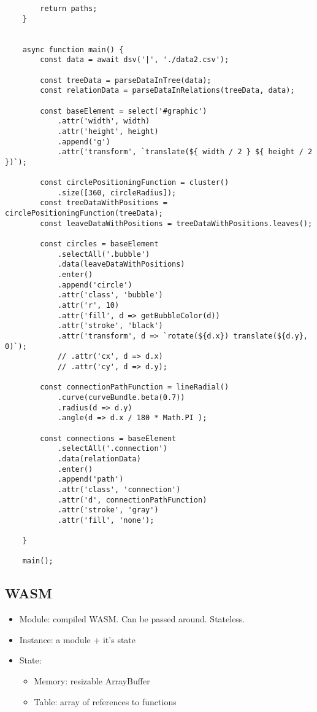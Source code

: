 {\begin{lstlisting}
        return paths;
    }
    
    
    async function main() {
        const data = await dsv('|', './data2.csv');
    
        const treeData = parseDataInTree(data);
        const relationData = parseDataInRelations(treeData, data);
    
        const baseElement = select('#graphic')
            .attr('width', width)
            .attr('height', height)
            .append('g')
            .attr('transform', `translate(${ width / 2 } ${ height / 2 })`);
    
        const circlePositioningFunction = cluster()
            .size([360, circleRadius]);
        const treeDataWithPositions = circlePositioningFunction(treeData);
        const leaveDataWithPositions = treeDataWithPositions.leaves();
    
        const circles = baseElement
            .selectAll('.bubble')
            .data(leaveDataWithPositions)
            .enter()
            .append('circle')
            .attr('class', 'bubble')
            .attr('r', 10)
            .attr('fill', d => getBubbleColor(d))
            .attr('stroke', 'black')
            .attr('transform', d => `rotate(${d.x}) translate(${d.y}, 0)`);
            // .attr('cx', d => d.x)
            // .attr('cy', d => d.y);
    
        const connectionPathFunction = lineRadial()
            .curve(curveBundle.beta(0.7))
            .radius(d => d.y)
            .angle(d => d.x / 180 * Math.PI );
    
        const connections = baseElement
            .selectAll('.connection')
            .data(relationData)
            .enter()
            .append('path')
            .attr('class', 'connection')
            .attr('d', connectionPathFunction)
            .attr('stroke', 'gray')
            .attr('fill', 'none');
    
    }
    
    main(); 
\end{lstlisting}


\subsection{WASM}

\begin{itemize}
    \item Module: compiled WASM. Can be passed around. Stateless.
    \item Instance: a module + it's state
    \item State: 
        \begin{itemize}
            \item Memory: resizable ArrayBuffer
            \item Table: array of references to functions
        \end{itemize}
\end{itemize}

}
